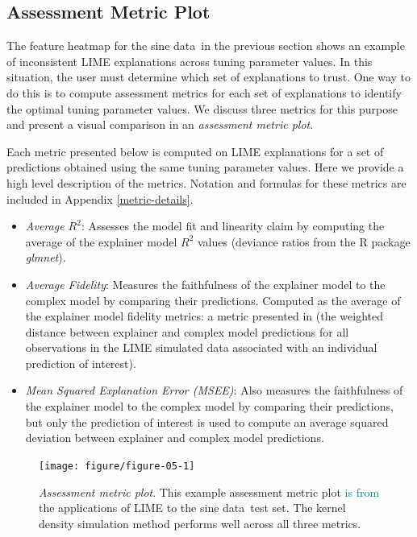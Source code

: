 \documentclass[AMS,STIX2COL]{WileyNJD-v2}\usepackage[]{graphicx}\usepackage[]{color}
\newenvironment{knitrout}{}{} %
\newcommand{\kge}[1]{\textcolor{teal}{#1}}
\newcommand{\data}{sine data}
\renewcommand{\sout}[1]{\unskip}
\begin{document}
\subsection{Assessment Metric Plot} \label{assess-metric}

The feature heatmap for the \data \ in the previous section shows an example of inconsistent LIME explanations across tuning parameter values. In this situation, the user must determine which set of explanations to trust. One way to do this is to compute assessment metrics for each set of explanations to identify the optimal tuning parameter values. We discuss three metrics for this purpose and present a visual comparison in an \emph{assessment metric plot}.

Each metric presented below is computed on LIME explanations for a set of predictions obtained using the same tuning parameter values. Here we provide a high level description of the metrics. Notation and formulas for these metrics are included in Appendix \ref{metric-details}.

\begin{itemize}
\item \emph{Average $R^2$}: Assesses the model fit and linearity claim by computing the average of the explainer model $R^2$ values (deviance ratios from the R package \emph{glmnet}).

\item \emph{Average Fidelity}: Measures the faithfulness of the explainer model to the complex model by comparing their predictions. Computed as the average of the explainer model fidelity metrics: a metric presented in \citet{ribeiro:2016} (the weighted distance between explainer and complex model predictions for all observations in the LIME simulated data associated with an individual prediction of interest). 

\item \emph{Mean Squared Explanation Error (MSEE)}: Also measures the faithfulness of the explainer model to the complex model by comparing their predictions, but only the prediction of interest is used to compute an average squared deviation between explainer and complex model predictions.
\end{itemize}

\begin{figure}[!bp]
\begin{knitrout}
\color{fgcolor}

{\centering \texttt{[image: figure/figure-05-1]} 

}



\end{knitrout}
\caption{\emph{Assessment metric plot}. This example assessment metric plot \sout{contains metrics computed on} \kge{is from} the applications of LIME to the \data \ test set. The kernel density simulation method\sout{s} performs well across all three metrics.}
\label{fig:figure-05}
\end{figure}
\end{document}
